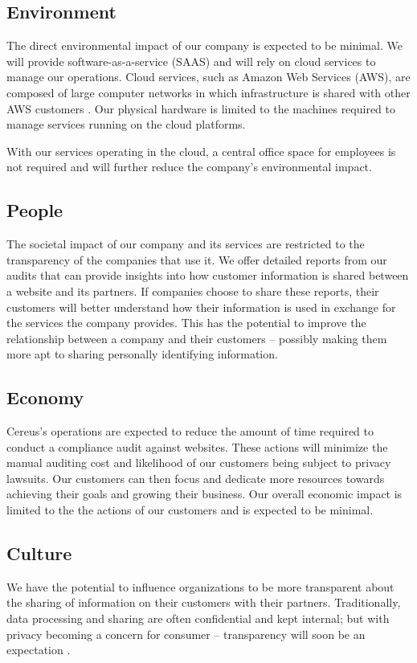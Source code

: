 \subsection{Environment}

The direct environmental impact of our company is expected to be minimal. We will provide software-as-a-service (SAAS) and will rely on cloud services to manage our operations. Cloud services, such as Amazon Web Services (AWS), are composed of large computer networks in which infrastructure is shared with other AWS customers \cite{aws.2020}. Our physical hardware is limited to the machines required to manage services running on the cloud platforms.

With our services operating in the cloud, a central office space for employees is not required and will further reduce the company's environmental impact.

\subsection{People}

The societal impact of our company and its services are restricted to the transparency of the companies that use it. We offer detailed reports from our audits that can provide insights into how customer information is shared between a website and its partners. If companies choose to share these reports, their customers will better understand how their information is used in exchange for the services the company provides. This has the potential to improve the relationship between a company and their customers -- possibly making them more apt to sharing personally identifying information.

\subsection{Economy}

Cereus's operations are expected to reduce the amount of time required to conduct a compliance audit against websites. These actions will minimize the manual auditing cost and likelihood of our customers being subject to privacy lawsuits. Our customers can then focus and dedicate more resources towards achieving their goals and growing their business. Our overall economic impact is limited to the the actions of our customers and is expected to be minimal.

\subsection{Culture}

We have the potential to influence organizations to be more transparent about the sharing of information on their customers with their partners. Traditionally, data processing and sharing are often confidential and kept internal; but with privacy becoming a concern for consumer -- transparency will soon be an expectation \cite{meehan.forbes.2019}.


